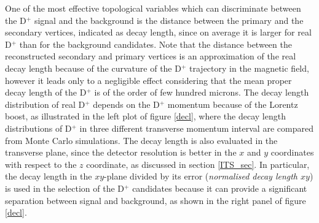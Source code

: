 \documentclass[b5paper,10pt,twoside,oldstyle,classica]{toptesi}
\begin{document}
One of the most effective topological variables which can discriminate between the D$^+$ signal and the background is the distance between the primary and the secondary vertices, indicated as decay length, since on average it is larger for real D$^+$ than for the background candidates. Note that the distance between the reconstructed secondary and primary vertices is an approximation of the real decay length because of the curvature of the D$^+$ trajectory in the magnetic field, however it leads only to a negligible effect considering that the mean proper decay length of the D$^+$ is of the order of few hundred microns. The decay length distribution of real D$^+$ depends on the D$^+$ momentum because of the Lorentz boost, as illustrated in the left plot of figure \ref{decl}, where the decay length distributions of D$^+$ in three different transverse momentum interval are compared from Monte Carlo simulations. The decay length is also evaluated in the transverse plane, since the detector resolution is better in the $x$ and $y$ coordinates with respect to the $z$ coordinate, as discussed in section \ref{ITS_sec}. In particular, the decay length in the $xy$-plane divided by its error (\textit{normalised decay length $xy$}) is used in the selection of the D$^+$ candidates because it can provide a significant separation between signal and background, as shown in the right panel of figure \ref{decl}. 
\end{document}
